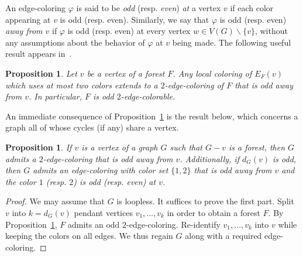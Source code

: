 \documentclass[a4paper,12pt]{article}
\newtheorem{proposition}[theorem]{Proposition}
\numberwithin{equation}{section}
\begin{document}
 An edge-coloring $\varphi$ is said to be \textit{odd} (resp. \textit{even}) \textit{at} a vertex $v$ if each color appearing  at $v$ is odd (resp. even). Similarly, we say that $\varphi$ is odd (resp. even) \textit{away from $v$} if $\varphi$ is odd (resp. even) at every vertex $w\in V(G)\backslash\{v\}$, without any assumptions about the behavior of $\varphi$ at $v$ being made.
The following useful result appears in~\cite{Mat06,Pet18}.

\begin{proposition}
    \label{forest}
    Let $v$ be a vertex of a forest $F$. Any local coloring of $E_F(v)$ which uses at most two colors extends to a $2$-edge-coloring of $F$ that is odd away from $v$. In particular, $F$ is odd $2$-edge-colorable.
\end{proposition}


An immediate consequence of Proposition~\ref{forest} is the result below, which concerns a graph all of whose cycles (if any) share a vertex.
 \begin{proposition}
    \label{consequences:forest}
    If $v$ is a vertex of a graph $G$ such that $G-v$ is a forest, then $G$ admits a $2$-edge-coloring that is odd away from $v$. Additionally, if $d_G(v)$ is odd, then $G$ admits an edge-coloring with color set $\{1,2\}$ that is odd away from $v$ and the color $1$ (resp. $2$) is odd (resp. even) at $v$.
 \end{proposition}

 \begin{proof}
 We may assume that $G$ is loopless. It suffices to prove the first part. Split $v$ into $k=d_G(v)$ pendant vertices $v_1,\ldots,v_k$ in order to obtain a forest $F$. By Proposition~\ref{forest}, $F$ admits an odd $2$-edge-coloring. Re-identify $v_1,\ldots,v_k$ into $v$ while keeping the colors on all edges. We thus regain $G$ along with a required edge-coloring.
 \end{proof}
\end{document}
